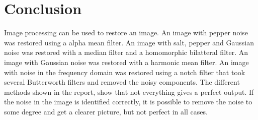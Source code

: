 \section{Conclusion}

Image processing can be used to restore an image.
An image with pepper noise was restored using a alpha mean filter.
An image with salt, pepper and Gaussian noise was restored with a median filter and a homomorphic bilatteral filter.
An image with Gaussian noise was restored with a harmonic mean filter.
An image with noise in the frequency domain was restored using a notch filter that took several Butterworth filters and removed the noisy components.
The different methods shown in the report, show that not everything gives a perfect output.
If the noise in the image is identified correctly, it is possible to remove the noise to some degree and get a clearer picture, but not perfect in all cases.